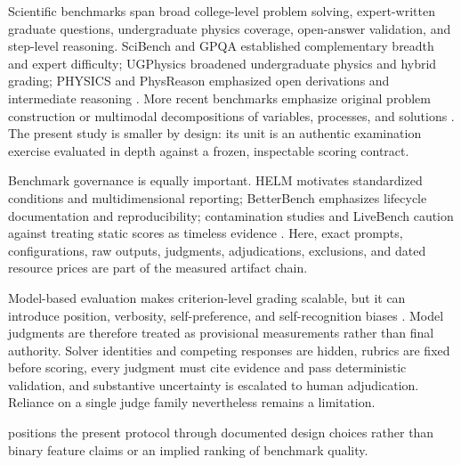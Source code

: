 \documentclass[11pt,a4paper,twocolumn]{article}
\begin{document}
Scientific benchmarks span broad college-level problem solving, expert-written
graduate questions, undergraduate physics coverage, open-answer validation,
and step-level reasoning. SciBench and GPQA established complementary breadth
and expert difficulty; UGPhysics broadened undergraduate physics and hybrid
grading; PHYSICS and PhysReason emphasized open derivations and intermediate
reasoning \citep{wang2024scibench,rein2024gpqa,xu2025ugphysics,
feng2025physics,zhang2025physreason}. More recent benchmarks emphasize original
problem construction or multimodal decompositions of variables, processes,
and solutions \citep{qiu2025phybench,dai2025physicsarena}. The present study is
smaller by design: its unit is an authentic examination exercise evaluated in
depth against a frozen, inspectable scoring contract.

Benchmark governance is equally important. HELM motivates standardized
conditions and multidimensional reporting; BetterBench emphasizes lifecycle
documentation and reproducibility; contamination studies and LiveBench caution
against treating static scores as timeless evidence
\citep{liang2023helm,reuel2024betterbench,deng2024contamination,
white2025livebench}. Here, exact prompts, configurations, raw outputs, judgments,
adjudications, exclusions, and dated resource prices are part of the measured
artifact chain.

Model-based evaluation makes criterion-level grading scalable, but it can
introduce position, verbosity, self-preference, and self-recognition biases
\citep{zheng2023judge,hashemi2024llmrubric,
panickssery2024self,verga2024juries}. Model judgments are therefore treated as
provisional measurements rather than final authority. Solver identities and
competing responses are hidden, rubrics are fixed before scoring, every
judgment must cite evidence and pass deterministic validation, and substantive
uncertainty is escalated to human adjudication. Reliance on a single judge
family nevertheless remains a limitation.

 positions the present protocol through
documented design choices rather than binary feature claims or an implied
ranking of benchmark quality.
\end{document}
